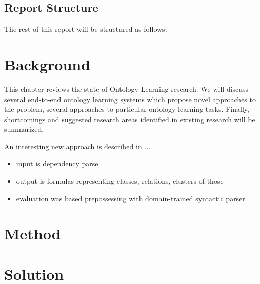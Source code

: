 \documentclass[a4paper]{report}
\begin{document}
\section{Report Structure}

The rest of this report will be structured as follows:

\chapter{Background}

This chapter reviews the state of Ontology Learning research.
We will discuss several end-to-end ontology learning systems which propose novel approaches to the problem, several approaches to particular ontology learning tasks.
Finally, shortcomings and suggested research areas identified in existing research will be summarized.

An interesting new approach is described in \cite{Poon2010OntoUSP}...
\begin{itemize}
  \item{input is dependency parse}
  \item{output is formulas representing classes, relations, clusters of those}
  \item{evaluation was based prepossessing with domain-trained syntactic parser}
\end{itemize}

\chapter{Method}

\chapter{Solution}
\end{document}
